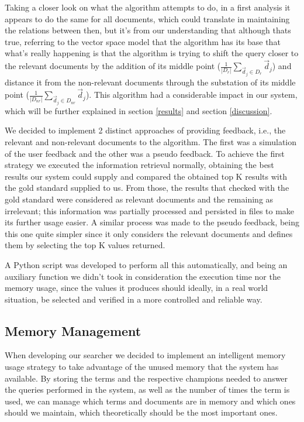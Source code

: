 \documentclass[12pt]{article}
\begin{document}
Taking a closer look on what the algorithm attempts to do, in a first analysis it appears to do the same for all documents, which could translate in maintaining the relations between then, but it's from our understanding that although thats true, referring to the vector space model that the algorithm has its base that what's really happening is that the algorithm is trying to shift the query closer to the relevant documents by the addition of its middle point ($\frac{1}{|D_{r}|} \sum_{ \vec{d}_{j} \in D_{r}} \vec{d}_{j}$) and distance it from the non-relevant documents through the substation of its middle point ($\frac{1}{|D_{nr}|} \sum_{ \vec{d}_{j} \in D_{nr}} \vec{d}_{j}$). This algorithm had a considerable impact in our system, which will be further explained in section \ref{results} and section \ref{discussion}.

We decided to implement 2 distinct approaches of providing feedback, i.e., the relevant and non-relevant documents to the algorithm. The first was a simulation of the user feedback and the other was a pseudo feedback. To achieve the first strategy we executed the information retrieval normally, obtaining the best results our system could supply and compared the obtained top K results with the gold standard supplied to us. From those, the results that checked with the gold standard were considered as relevant documents and the remaining as irrelevant; this information was partially processed and persisted in files to make its further usage easier. A similar process was made to the pseudo feedback, being this one quite simpler since it only considers the relevant documents and defines them by selecting the top K values returned.

A Python script was developed to perform all this automatically, and being an auxiliary function we didn't took in consideration the execution time nor the memory usage, since the values it produces should ideally, in a real world situation, be selected and verified in a more controlled and reliable way.

\subsection{Memory Management} \label{memory}
When developing our searcher we decided to implement an intelligent memory usage strategy to take advantage of the unused memory that the system has available. By storing the terms and the respective champions needed to answer the queries performed in the system, as well as the number of times the term is used, we can manage which terms and documents are in memory and which ones should we maintain, which theoretically should be the most important ones.
\end{document}
